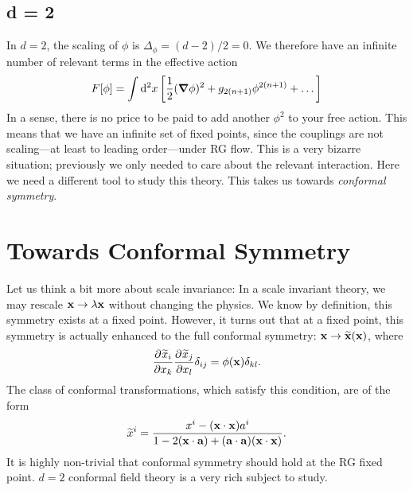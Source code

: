 \subsection*{d = 2}%

In $d = 2$, the scaling of $\phi$ is $\Delta_\phi = (d-2)/2 = 0$. We therefore have an infinite number of relevant terms in the effective action
\begin{equation}
  F[\phi] = \int \dd[2]{x} \left[ \frac{1}{2} (\grad \phi)^2+ g_{2(n+1)} \phi^{2(n+1)} +\dots \right]
\end{equation}
In a sense, there is no price to be paid to add another $\phi^2$ to your free action.
This means that we have an infinite set of fixed points, since the couplings are not scaling---at least to leading order---under RG flow.
This is a very bizarre situation; previously we only needed to care about the relevant interaction.
Here we need a different tool to study this theory.
This takes us towards \emph{conformal symmetry}.

\section{Towards Conformal Symmetry}%
\label{sec:towards_conformal_symmetry}

Let us think a bit more about scale invariance: In a scale invariant theory, we may rescale $\vb{x} \to \lambda \vb{x}$ without changing the physics. We know by definition, this symmetry exists at a fixed point.
However, it turns out that at a fixed point, this symmetry is actually enhanced to the full conformal symmetry: $\vb{x} \to \widetilde{\vb{x}}(\vb{x})$, where
\begin{equation}
  \frac{\partial^{} \widetilde{x}_i}{\partial x_k} \frac{\partial^{} \widetilde{x}_j}{\partial x_l} \delta_{ij} = \phi(\vb{x}) \delta_{kl}.
\end{equation}
The class of conformal transformations, which satisfy this condition, are of the form
\begin{equation}
  \widetilde{x}^i = \frac{x^i - (\vb{x} \cdot \vb{x}) a^i}{1 - 2 (\vb{x} \cdot \vb{a}) + (\vb{a} \cdot \vb{a})(\vb{x} \cdot \vb{x})}.
\end{equation}
It is highly non-trivial that conformal symmetry should hold at the RG fixed point.
$d = 2$ conformal field theory is a very rich subject to study.

